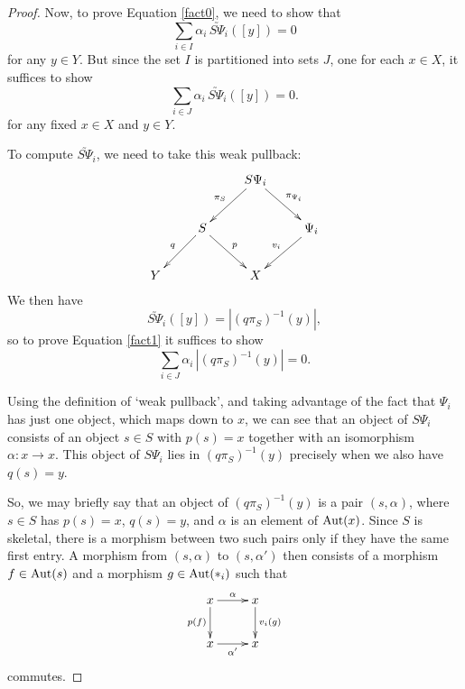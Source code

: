 \documentclass{article}
\renewcommand{\to}{\rightarrow}
\newcommand{\maps}{\colon}
\newcommand{\Aut}{{\rm Aut}}
\begin{document}
\begin{proof}
Now, to prove Equation \ref{fact0}, we need to show that 
\[ \sum_{i \in I} \alpha_i \, \utilde{S\Psi_i}([y]) = 0\]
for any $y \in Y$.  But since the set $I$ is partitioned into sets
$J$, one for each $x \in X$, it suffices to show
\begin{equation}
\label{fact1}
\sum_{i \in J} \alpha_i \, \utilde{S\Psi_i}([y]) = 0 .
\end{equation}
for any fixed $x \in X$ and $y \in Y$.

To compute $\utilde{S\Psi_i}$, we need
to take this weak pullback:
\[
\xymatrix{
& & S\Psi_i \ar[dl]_{\pi_S}\ar[dr]^{\pi_{\Psi_i}} & \\
& S \ar[dl]_{q} \ar[dr]^{p} & & \Psi_i \ar[dl]_{v_i} \\
Y & & X &  
}
\]
We then have
\begin{equation}
\label{formula1}
    \utilde{S \Psi_i}([y]) = |(q \pi_S)^{-1}(y)| , 
\end{equation}
so to prove Equation \ref{fact1} it suffices to show
\begin{equation}
\label{fact2}
\sum_{i \in J} \alpha_i \, |(q \pi_S)^{-1}(y)| = 0 .
\end{equation}

Using the definition of `weak pullback', and taking advantage of the
fact that $\Psi_i$ has just one object, which maps down to $x$, we can
see that an object of $S \Psi_i$ consists of an object $s \in S$ with
$p(s) = x$ together with an isomorphism $\alpha \maps x \to x$.  This
object of $S\Psi_i$ lies in $(q \pi_S)^{-1}(y)$ precisely when we also
have $q(s) = y$.

So, we may briefly say that an object of $(q\pi_S)^{-1}(y)$ is a pair
$(s, \alpha)$, where $s \in S$ has $p(s) = x$, $q(s) = y$, and
$\alpha$ is an element of $\Aut(x)$.  Since $S$ is skeletal, there is
a morphism between two such pairs only if they have the same first
entry.  A morphism from $(s,\alpha)$ to $(s,\alpha')$ then consists of
a morphism $f \in \Aut(s)$ and a morphism $g \in \Aut(\ast_i)$ such
that
\[
\xymatrix{
x \ar[r]^{\alpha}\ar[d]_{p(f)} & x\ar[d]^{v_i(g)} \\
x \ar[r]_{\alpha'} & x
}
\]
commutes.  


\end{proof}
\end{document}
